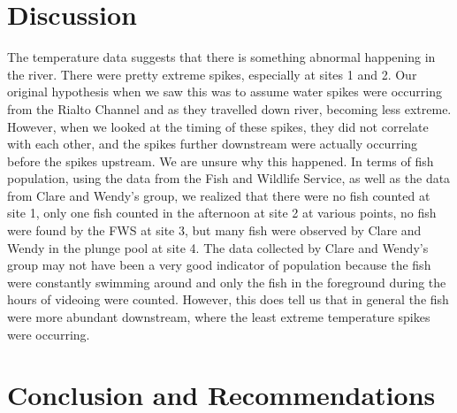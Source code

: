 \documentclass{article}
\begin{document}
\section{Discussion}
 The temperature data suggests that there is something abnormal happening in the river. There were pretty extreme spikes, especially at sites 1 and 2. Our original hypothesis when we saw this was to assume water spikes were occurring from the Rialto Channel and as they travelled down river, becoming less extreme. However, when we looked at the timing of these spikes, they did not correlate with each other, and the spikes further downstream were actually occurring before the spikes upstream. We are unsure why this happened. In terms of fish population, using the data from the Fish and Wildlife Service, as well as the data from Clare and Wendy's group, we realized that there were no fish counted at site 1, only one fish counted in the afternoon at site 2 at various points, no fish were found by the FWS at site 3, but many fish were observed by Clare and Wendy in the plunge pool at site 4. The data collected by Clare and Wendy’s group may not have been a very good indicator of population because the fish were constantly swimming around and only the fish in the foreground during the hours of videoing were counted. However, this does tell us that in general the fish were more abundant downstream, where the least extreme temperature spikes were occurring. 


\section{Conclusion and Recommendations}
\end{document}
